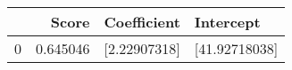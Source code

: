 \begin{tabular}{lrll}
\toprule
 & Score & Coefficient & Intercept \\
\midrule
0 & 0.645046 & [2.22907318] & [41.92718038] \\
\bottomrule
\end{tabular}
